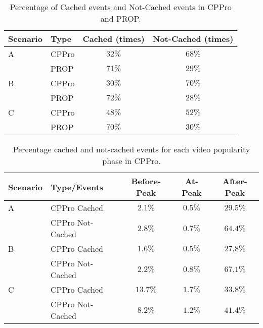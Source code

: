 \begin{table}[!t]
\small
\caption{Percentage of Cached events and Not-Cached events in CPPro and PROP.}
\label{tab:stacked1}
\centering
\begin{tabular}{|l|l|c|c|}
\hline
Scenario & Type & Cached (times)& Not-Cached (times) \\ %
\hline
A & CPPro & $32\%$ & $68\%$ \\%
\hline
 & PROP & $71\%$ & $29\%$ \\ %
\hline

B & CPPro & $30\%$ & $70\%$ \\ %
\hline
 & PROP & $72\%$ & $28\%$ \\%
\hline
C & CPPro & $48\%$ & $52\%$  \\%
\hline
 & PROP & $70\%$ & $30\%$ \\%
\hline
\end{tabular}
\end{table}



\begin{table}[!t]
\small
\centering
\caption{Percentage cached and not-cached events for each video popularity phase in CPPro.}
\label{tab:stacked2}
\centering
\begin{tabular}{|l|l|c|c|c|}
\hline
Scenario & Type/Events & Before-Peak & At-Peak  & After-Peak \\
\hline
A & CPPro Cached & $2.1\%$ & $0.5\%$ & $29.5\%$  \\
\hline
 & CPPro Not-Cached & $2.8\%$ & $0.7\%$ & $64.4\%$ \\
 \hline

B & CPPro Cached & $1.6\%$ & $0.5\%$ & $27.8\%$ \\
\hline
 & CPPro Not-Cached & $2.2\%$ & $0.8\%$ & $67.1\%$ \\
\hline

C & CPPro Cached & $13.7\%$ & $1.7\%$ & $33.8\%$ \\
\hline
 & CPPro Not-Cached & $8.2\%$ & $1.2\%$ & $41.4\%$ \\
\hline

\end{tabular}
\end{table}


